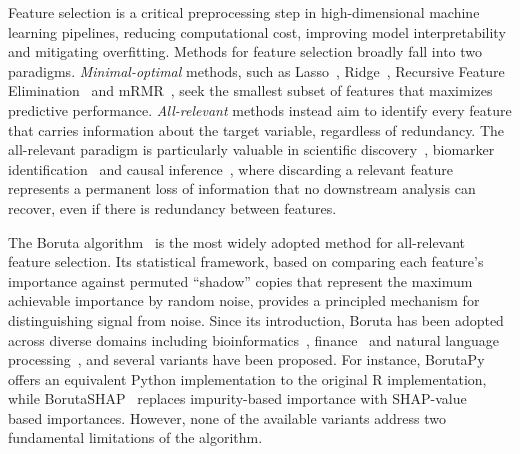 \documentclass[runningheads]{llncs}
\begin{document}
Feature selection is a critical preprocessing step in high-dimensional machine learning pipelines, reducing computational cost, improving model interpretability and mitigating overfitting. Methods for feature selection broadly fall into two paradigms. \emph{Minimal-optimal} methods, such as Lasso~\cite{tibshirani1996lasso}, Ridge~\cite{hoerl1970ridge}, Recursive Feature Elimination~\cite{guyon2002rfe} and mRMR~\cite{peng2005mrmr}, seek the smallest subset of features that maximizes predictive performance. \emph{All-relevant} methods instead aim to identify every feature that carries information about the target variable, regardless of redundancy. The all-relevant paradigm is particularly valuable in scientific discovery~\cite{rak2019evaluation}, biomarker identification~\cite{mardian2023ovarian} and causal inference~\cite{pellet2008markov}, where discarding a relevant feature represents a permanent loss of information that no downstream analysis can recover, even if there is redundancy between features.

The Boruta algorithm~\cite{kursa2010feature,kursa2010boruta} is the most widely adopted method for all-relevant feature selection. Its statistical framework, based on comparing each feature's importance against permuted ``shadow'' copies that represent the maximum achievable importance by random noise, provides a principled mechanism for distinguishing signal from noise. Since its introduction, Boruta has been adopted across diverse domains including bioinformatics~\cite{rak2019evaluation,mardian2023ovarian}, finance~\cite{pinto2024forecasting,li2024stock} and natural language processing~\cite{sallah2024fake,tan2024mosquito}, and several variants have been proposed. For instance, BorutaPy~\cite{borutapy} offers an equivalent Python implementation to the original R implementation, while BorutaSHAP~\cite{borutashap} replaces impurity-based importance with SHAP-value~\cite{lundberg2017shap} based importances. However, none of the available variants address two fundamental limitations of the algorithm. 
\end{document}
